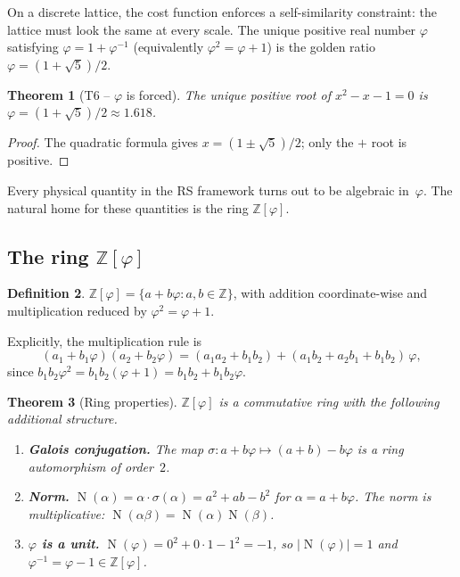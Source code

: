 \documentclass[11pt,a4paper]{article}
\theoremstyle{plain}
\newtheorem{theorem}{Theorem}[section]
\theoremstyle{definition}
\newtheorem{definition}[theorem]{Definition}
\theoremstyle{remark}
\newcommand{\phig}{\varphi}
\newcommand{\ZZ}{\mathbb{Z}}
\DeclareMathOperator{\Nm}{N}             %
\newcommand{\conj}{\sigma}               %
\begin{document}
On a discrete lattice, the cost function enforces a self-similarity
constraint: the lattice must look the same at every scale.  The
unique positive real number $\phig$ satisfying
$\phig=1+\phig^{-1}$ (equivalently $\phig^2=\phig+1$)
is the golden ratio $\phig=(1+\sqrt5)/2$.

\begin{theorem}[T6 -- $\phig$ is forced]\label{thm:T6}
The unique positive root of $x^2-x-1=0$ is
$\phig=(1{+}\sqrt5)/2\approx1.618$.
\end{theorem}

\begin{proof}
The quadratic formula gives $x=(1\pm\sqrt5)/2$; only the
$+$ root is positive.
\end{proof}

Every physical quantity in the RS framework turns out to be
algebraic in~$\phig$.  The natural home for these quantities is the ring
$\ZZ[\phig]$.

\subsection{The ring $\ZZ[\phig]$}

\begin{definition}\label{def:phi-ring}
$\ZZ[\phig]=\{a+b\phig:a,b\in\ZZ\}$, with addition
coordinate-wise and multiplication reduced by $\phig^2=\phig+1$.
\end{definition}

Explicitly, the multiplication rule is
\begin{equation}\label{eq:phi-mul}
  (a_1+b_1\phig)(a_2+b_2\phig)
  =(a_1a_2+b_1b_2)+(a_1b_2+a_2b_1+b_1b_2)\,\phig,
\end{equation}
since $b_1b_2\phig^2=b_1b_2(\phig+1)=b_1b_2+b_1b_2\phig$.

\begin{theorem}[Ring properties]\label{thm:phi-ring}
$\ZZ[\phig]$ is a commutative ring with the following additional
structure.
\begin{enumerate}[nosep,label=\textup{(\alph*)}]
\item \textbf{Galois conjugation.}
  The map $\conj:a+b\phig\mapsto(a{+}b)-b\phig$ is a ring
  automorphism of order~$2$.
\item \textbf{Norm.}
  $\Nm(\alpha)=\alpha\cdot\conj(\alpha)=a^2+ab-b^2$ for
  $\alpha=a+b\phig$.  The norm is multiplicative:
  $\Nm(\alpha\beta)=\Nm(\alpha)\Nm(\beta)$.
\item \textbf{$\phig$ is a unit.}
  $\Nm(\phig)=0^2+0\cdot1-1^2=-1$, so $|\Nm(\phig)|=1$ and
  $\phig^{-1}=\phig-1\in\ZZ[\phig]$.
\end{enumerate}
\end{theorem}
\end{document}
